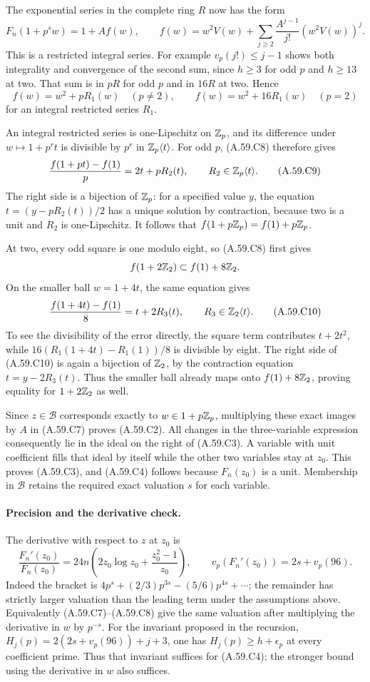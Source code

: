 The exponential series in the complete ring $R$ now
has the form
\[
 F_n(1+p^s w)=1+A f(w),\qquad
 f(w)=w^2V(w)+
       \sum_{j\ge2}\frac{A^{j-1}}{j!}(w^2V(w))^j.
\tag{A.59.C7}
\]
This is a restricted integral series.  For example
$v_p(j!)\le j-1$ shows both integrality and convergence
of the second sum, since $h\ge3$ for odd $p$ and
$h\ge13$ at two.  That sum is in $pR$ for odd $p$
and in $16R$ at two.  Hence
\[
 f(w)=w^2+pR_1(w)\quad(p\ne2),\qquad
 f(w)=w^2+16R_1(w)\quad(p=2)
\tag{A.59.C8}
\]
for an integral restricted series $R_1$.

An integral restricted series is one-Lipschitz on
$\mathbb Z_p$, and its difference under $w\mapsto1+p^r t$
is divisible by $p^r$ in $\mathbb Z_p\langle t\rangle$.
For odd $p$, (A.59.C8) therefore gives
\[
       \frac{f(1+pt)-f(1)}p=2t+pR_2(t),
                   \qquad R_2\in\mathbb Z_p\langle t\rangle.
\tag{A.59.C9}
\]
The right side is a bijection of $\mathbb Z_p$: for a specified
value $y$, the equation
$t=(y-pR_2(t))/2$ has a unique solution by contraction,
because two is a unit and $R_2$ is one-Lipschitz.
It follows that
$f(1+p\mathbb Z_p)=f(1)+p\mathbb Z_p$.

At two, every odd square is one modulo eight, so
(A.59.C8) first gives
\[
                 f(1+2\mathbb Z_2)\subset f(1)+8\mathbb Z_2.
\]
On the smaller ball $w=1+4t$, the same equation gives
\[
        \frac{f(1+4t)-f(1)}8=t+2R_3(t),
                    \qquad R_3\in\mathbb Z_2\langle t\rangle.
\tag{A.59.C10}
\]
To see the divisibility of the error directly, the square
term contributes $t+2t^2$, while
$16(R_1(1+4t)-R_1(1))/8$ is divisible by eight.
The right side of (A.59.C10) is again a bijection of
$\mathbb Z_2$, by the contraction equation
$t=y-2R_3(t)$.  Thus the smaller ball already maps onto
$f(1)+8\mathbb Z_2$, proving equality for $1+2\mathbb Z_2$ as well.

Since $z\in\mathcal B$ corresponds exactly to
$w\in1+p\mathbb Z_p$, multiplying these exact images by $A$
in (A.59.C7) proves (A.59.C2).  All changes in the
three-variable expression consequently lie in the
ideal on the right of (A.59.C3).  A variable with unit
coefficient fills that ideal by itself while the
other two variables stay at $z_0$.
This proves (A.59.C3), and (A.59.C4) follows because
$F_n(z_0)$ is a unit.  Membership in $\mathcal B$
retains the required exact valuation $s$ for each
variable.

\paragraph{Precision and the derivative check.}
The derivative with respect to $z$ at $z_0$ is
\[
 \frac{F_n'(z_0)}{F_n(z_0)}
   =24n\left(2z_0\log z_0+\frac{z_0^2-1}{z_0}\right),
 \qquad v_p(F_n'(z_0))=2s+v_p(96).
\tag{A.59.C11}
\]
Indeed the bracket is
$4p^s+(2/3)p^{3s}-(5/6)p^{4s}+\cdots$;
the remainder has strictly larger valuation than
the leading term under the assumptions above.
Equivalently (A.59.C7)--(A.59.C8) give the same valuation
after multiplying the derivative in $w$ by $p^{-s}$.
For the invariant proposed in the recursion,
$H_j(p)=2(2s+v_p(96))+j+3$,
one has $H_j(p)\ge h+\epsilon_p$ at every coefficient
prime.  Thus that invariant suffices for (A.59.C4);
the stronger bound using the derivative in $w$
also suffices.

